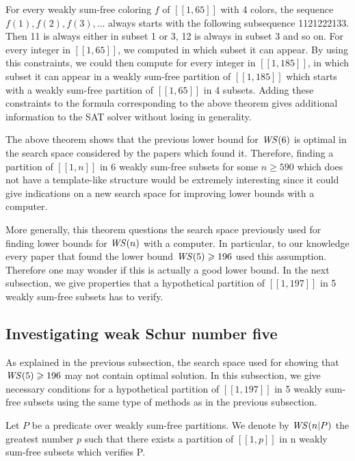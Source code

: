 \par
For every weakly sum-free coloring \(f\) of \([\![1,65]\!]\) with 4 colors, the sequence \(f(1), f(2), f(3), ...\) always
starts with the following subsequence 1121222133. Then 11 is always
either in subset 1 or 3, 12 is always in subset 3 and so on. For every integer in \([\![1,65]\!]\), we computed in which
subset it can appear.
By using this constraints, we could then compute for every integer in \([\![1,185]\!]\), in which subset it can appear
in a weakly sum-free
partition of \([\![1,185]\!]\) which starts with a weakly sum-free partition of \([\![1,65]\!]\) in 4 subsets. Adding
these constraints to the
formula corresponding to the above theorem gives additional information to the SAT solver without losing in generality.

\par
The above theorem shows that the previous lower bound for \(\mathit{WS} (6)\) is optimal in the search space considered by the
papers which found it.
Therefore, finding a partition of \([\![1,n]\!]\) in 6 weakly sum-free subsets for some \(n \geqslant 590\) which does
not have a template-like structure
would be extremely interesting since it could give indications on a new search space for improving lower bounds with a
computer. 

\par More generally, this theorem questions the search space previously used for finding lower bounds for \(\mathit{WS} (n)\) 
with a computer. In particular, to our knowledge every paper that found the lower bound \(\mathit{WS} (5) \geqslant 196\) 
used this assumption. Therefore one may wonder if this is actually a good lower bound. In the next subsection, we give 
properties that a hypothetical partition of \([\![1,197]\!]\) in 5 weakly sum-free subsets has to verify.


\subsection{Investigating weak Schur number five}

\qquad As explained in the previous subsection, the search space used for showing that \(\mathit{WS} (5) \geqslant 196\) may not contain
optimal solution. In this subsection,
we give necessary conditions for a hypothetical partition of \([\![1,197]\!]\) in 5 weakly sum-free subsets using the
same type of methods as in the
previous subsection.

\begin{notation}
Let \(P\) be a predicate over weakly sum-free partitions. We denote by \(\mathit{WS} (n | P)\) the greatest number \(p\) such that
there exists a partition of
\([\![1,p]\!]\) in n weakly sum-free subsets which verifies P.
\end{notation}

